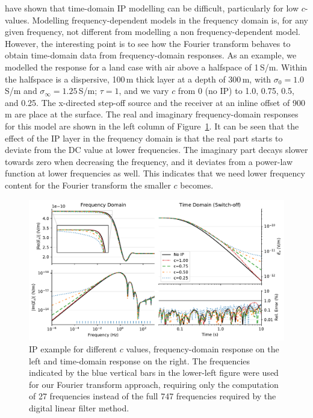 \documentclass[extra, camera,%
]{gji}
\newlength{\fwidth}
\begin{document}
\cite{GJI.17.Commer} have shown that time-domain IP modelling can be difficult,
particularly for low $c$-values. Modelling frequency-dependent models in the
frequency domain is, for any given frequency, not different from modelling a
non frequency-dependent model. However, the interesting point is to see how the
Fourier transform behaves to obtain time-domain data from frequency-domain
responses. As an example, we modelled the response for a land case with air
above a halfspace of 1\,S/m. Within the halfspace is a dispersive, 100\,m thick
layer at a depth of 300\,m, with $\sigma_0=1.0\,$S/m and
$\sigma_\infty=1.25\,$S/m; $\tau=1$, and we vary $c$ from 0 (no IP) to 1.0,
0.75, 0.5, and 0.25. The x-directed step-off source and the receiver at an
inline offset of 900\,m are place at the surface. The real and imaginary
frequency-domain responses for this model are shown in the left column of
Figure~\ref{fig:CCM}. It can be seen that the effect of the IP layer in the
frequency domain is that the real part starts to deviate from the DC value at
lower frequencies. The imaginary part decays slower towards zero when
decreasing the frequency, and it deviates from a power-law function at lower
frequencies as well. This indicates that we need lower frequency content for
the Fourier transform the smaller $c$ becomes.
%
\begin{figure}
  \centering
  \includegraphics[width=\fwidth]{11-cole-cole-model}
  \caption{IP example for different $c$ values, frequency-domain response on
    the left and time-domain response on the right. The frequencies indicated
    by the blue vertical bars in the lower-left figure were used for our
    Fourier transform approach, requiring only the computation of 27
    frequencies instead of the full 747 frequencies required by the digital
    linear filter method.}
  \label{fig:CCM}
\end{figure}
%
\end{document}
